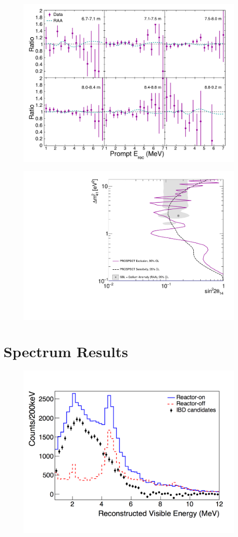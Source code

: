 \begin{figure}[H]
	\centering
	\includegraphics[width=0.7\linewidth]{tex/7-oscillation-images/BaselineSpectra}
	\caption{}
	\label{fig:baselinespectra}
\end{figure}

\begin{figure}[H]
	\centering
	\includegraphics[width=0.7\linewidth]{tex/7-oscillation-images/Exclusion_Sensitivity_Final}
	\caption{}
	\label{fig:exclusionsensitivityfinal}
\end{figure}



\section{Spectrum Results}
\begin{figure}[H]
	\centering
	\includegraphics[width=0.7\linewidth]{tex/7-oscillation-images/Spectrum}
	\caption{}
	\label{fig:spectrumresults}
\end{figure}




